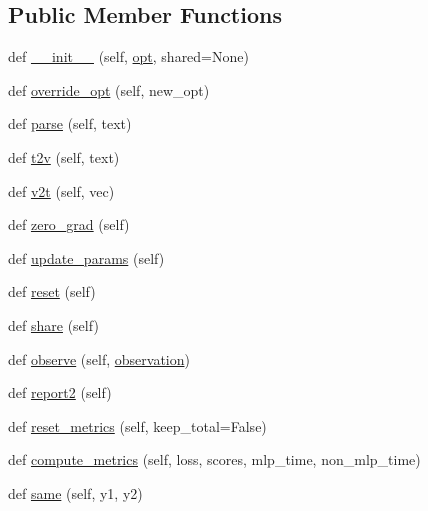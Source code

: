 \subsection*{Public Member Functions}
\begin{DoxyCompactItemize}
\item 
def \hyperlink{classkvmemnn_1_1KvmemnnAgent_a7a510bb5ac2444d5a30715c77bf55684}{\+\_\+\+\_\+init\+\_\+\+\_\+} (self, \hyperlink{classkvmemnn_1_1KvmemnnAgent_ab562f6f2d7ad624a9c76c59df5efcb6d}{opt}, shared=None)
\item 
def \hyperlink{classkvmemnn_1_1KvmemnnAgent_ae0c109b266a7d5d1585dc9247334cf89}{override\+\_\+opt} (self, new\+\_\+opt)
\item 
def \hyperlink{classkvmemnn_1_1KvmemnnAgent_ab29b337013bf1b4f5c33162c84f6528e}{parse} (self, text)
\item 
def \hyperlink{classkvmemnn_1_1KvmemnnAgent_adf2131a64c05d6d6538b431be1ea8531}{t2v} (self, text)
\item 
def \hyperlink{classkvmemnn_1_1KvmemnnAgent_a781d63f517c888a8e64fedebed676d2b}{v2t} (self, vec)
\item 
def \hyperlink{classkvmemnn_1_1KvmemnnAgent_ae907d1e9d3b1ce9708d40b905d4888f5}{zero\+\_\+grad} (self)
\item 
def \hyperlink{classkvmemnn_1_1KvmemnnAgent_afaf2052da2fa6c4eb1278dd0bd78f2cf}{update\+\_\+params} (self)
\item 
def \hyperlink{classkvmemnn_1_1KvmemnnAgent_aaa32e10a82350c998426e2731a4afb9e}{reset} (self)
\item 
def \hyperlink{classkvmemnn_1_1KvmemnnAgent_a2895b6a73d2c0661efce10ccc6bd9e85}{share} (self)
\item 
def \hyperlink{classkvmemnn_1_1KvmemnnAgent_a54b08c3fbe7f12d55a8ea6669b18726d}{observe} (self, \hyperlink{classkvmemnn_1_1KvmemnnAgent_a35de1b119d32bdc99bedbae205fd1555}{observation})
\item 
def \hyperlink{classkvmemnn_1_1KvmemnnAgent_af8c3f5e8c17e1f1355eb2e416fd92e26}{report2} (self)
\item 
def \hyperlink{classkvmemnn_1_1KvmemnnAgent_a8d5a1f2f7e78582e5a75c85cbddfef39}{reset\+\_\+metrics} (self, keep\+\_\+total=False)
\item 
def \hyperlink{classkvmemnn_1_1KvmemnnAgent_aa7f07d5123c47f74f48ae395a66c9d73}{compute\+\_\+metrics} (self, loss, scores, mlp\+\_\+time, non\+\_\+mlp\+\_\+time)
\item 
def \hyperlink{classkvmemnn_1_1KvmemnnAgent_a59c6078593c61e0adeda8487def4706e}{same} (self, y1, y2)

\end{DoxyCompactItemize}
